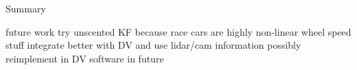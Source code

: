 Summary

future work
try unscented KF because race cars are highly non-linear
wheel speed stuff
integrate better with DV and use lidar/cam information
possibly reimplement in DV software in future
